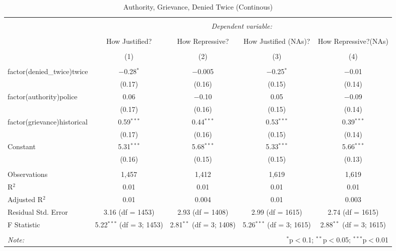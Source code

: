 
\begin{table}[!htbp] \centering 
  \caption{Authority, Grievance, Denied Twice (Continous)} 
  \label{} 
\begin{tabular}{@{\extracolsep{5pt}}lcccc} 
\\[-1.8ex]\hline 
\hline \\[-1.8ex] 
 & \multicolumn{4}{c}{\textit{Dependent variable:}} \\ 
\cline{2-5} 
\\[-1.8ex] & How Justified? & How Repressive? & How Justified (NAs)? & How Repressive?(NAs) \\ 
\\[-1.8ex] & (1) & (2) & (3) & (4)\\ 
\hline \\[-1.8ex] 
 factor(denied\_twice)twice & $-$0.28$^{*}$ & $-$0.005 & $-$0.25$^{*}$ & $-$0.01 \\ 
  & (0.17) & (0.16) & (0.15) & (0.14) \\ 
  factor(authority)police & 0.06 & $-$0.10 & 0.05 & $-$0.09 \\ 
  & (0.17) & (0.16) & (0.15) & (0.14) \\ 
  factor(grievance)historical & 0.59$^{***}$ & 0.44$^{***}$ & 0.53$^{***}$ & 0.39$^{***}$ \\ 
  & (0.17) & (0.16) & (0.15) & (0.14) \\ 
  Constant & 5.31$^{***}$ & 5.68$^{***}$ & 5.33$^{***}$ & 5.66$^{***}$ \\ 
  & (0.16) & (0.15) & (0.15) & (0.13) \\ 
 \hline \\[-1.8ex] 
Observations & 1,457 & 1,412 & 1,619 & 1,619 \\ 
R$^{2}$ & 0.01 & 0.01 & 0.01 & 0.01 \\ 
Adjusted R$^{2}$ & 0.01 & 0.004 & 0.01 & 0.003 \\ 
Residual Std. Error & 3.16 (df = 1453) & 2.93 (df = 1408) & 2.99 (df = 1615) & 2.74 (df = 1615) \\ 
F Statistic & 5.22$^{***}$ (df = 3; 1453) & 2.81$^{**}$ (df = 3; 1408) & 5.26$^{***}$ (df = 3; 1615) & 2.88$^{**}$ (df = 3; 1615) \\ 
\hline 
\hline \\[-1.8ex] 
\textit{Note:}  & \multicolumn{4}{r}{$^{*}$p$<$0.1; $^{**}$p$<$0.05; $^{***}$p$<$0.01} \\ 
\end{tabular} 
\end{table} 

